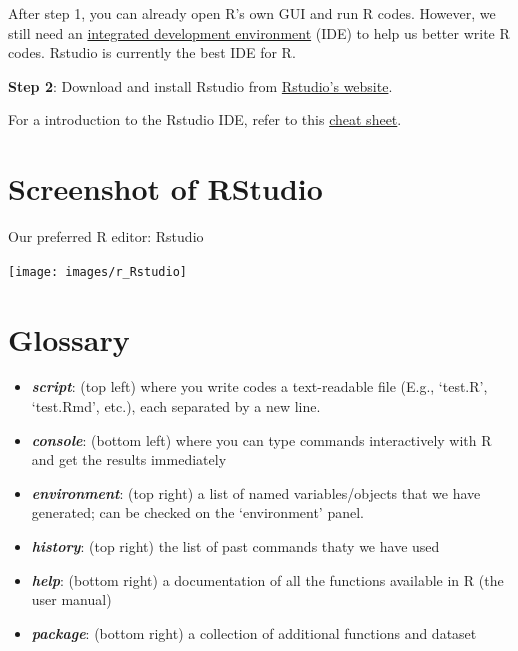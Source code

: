 \documentclass[
  11pt,
]{book}
\begin{document}
After step 1, you can already open R's own GUI and run R codes. However, we still need an \href{https://en.wikipedia.org/wiki/Integrated_development_environment}{integrated development environment} (IDE) to help us better write R codes. Rstudio is currently the best IDE for R.

\textbf{Step 2}: Download and install Rstudio from \href{https://www.rstudio.com/products/rstudio/download/}{Rstudio's website}.

For a introduction to the Rstudio IDE, refer to this \href{https://github.com/rstudio/cheatsheets/raw/master/rstudio-ide.pdf}{cheat sheet}.

\hypertarget{screenshot-of-rstudio}{%
\section{Screenshot of RStudio}\label{screenshot-of-rstudio}}

Our preferred R editor: Rstudio

\begin{center}\texttt{[image: images/r\_Rstudio]} \end{center}

\hypertarget{glossary}{%
\section{Glossary}\label{glossary}}

\begin{itemize}
\item
  \textbf{\emph{script}}: (top left) where you write codes a text-readable file (E.g., `test.R', `test.Rmd', etc.), each separated by a new line.
\item
  \textbf{\emph{console}}: (bottom left) where you can type commands interactively with R and get the results immediately
\item
  \textbf{\emph{environment}}: (top right) a list of named variables/objects that we have generated; can be checked on the `environment' panel.
\item
  \textbf{\emph{history}}: (top right) the list of past commands thaty we have used
\item
  \textbf{\emph{help}}: (bottom right) a documentation of all the functions available in R (the user manual)
\item
  \textbf{\emph{package}}: (bottom right) a collection of additional functions and dataset
\end{itemize}
\end{document}
